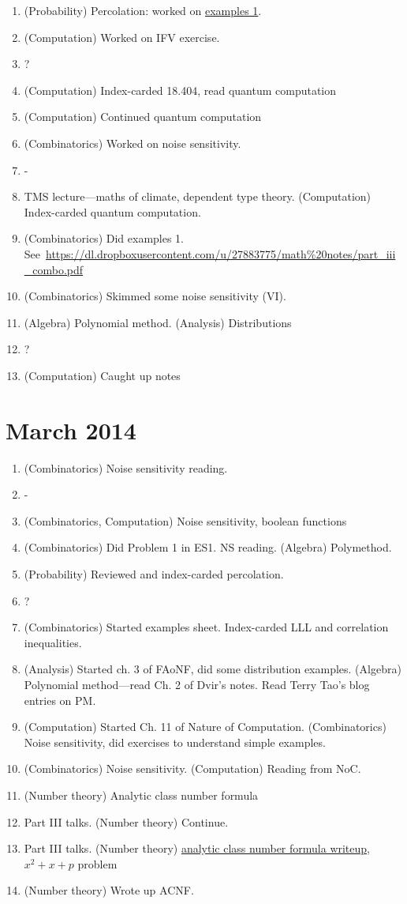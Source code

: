 \begin{enumerate}
\item (Probability) Percolation: worked on \hyperlink{prob/perc/ex1}{examples 1}.
\item (Computation) Worked on IFV exercise.
\item ?
\item (Computation) Index-carded 18.404, read quantum computation
\item (Computation) Continued quantum computation
\item (Combinatorics) Worked on noise sensitivity.
\item -
\item TMS lecture---maths of climate, dependent type theory. (Computation) Index-carded quantum computation.
\item (Combinatorics) Did examples 1. See~\url{https://dl.dropboxusercontent.com/u/27883775/math\%20notes/part_iii_combo.pdf}
\item (Combinatorics) Skimmed some noise sensitivity (VI). 
\item (Algebra) Polynomial method. (Analysis) Distributions
\item ?
\item (Computation) Caught up notes
\end{enumerate}
\section{March 2014}
\begin{enumerate}
\item (Combinatorics) Noise sensitivity reading.
\item -
\item (Combinatorics, Computation) Noise sensitivity, boolean functions
\item (Combinatorics) Did Problem 1 in ES1. NS reading. (Algebra) Polymethod. 
\item (Probability) Reviewed and index-carded percolation.
\item ?
\item (Combinatorics) Started examples sheet. Index-carded LLL and correlation inequalities.
\item (Analysis) Started ch. 3 of FAoNF, did some distribution examples. (Algebra) Polynomial method---read Ch. 2 of Dvir's notes. Read Terry Tao's blog entries on PM.
\item (Computation) Started Ch. 11 of Nature of Computation. (Combinatorics) Noise sensitivity, did exercises to understand simple examples.
\item (Combinatorics) Noise sensitivity. (Computation) Reading from NoC.
\item
(Number theory) Analytic class number formula
\item
Part III talks. (Number theory) Continue.
\item Part III talks. (Number theory) 
\hyperlink{nt/ant/aant}{analytic class number formula writeup}, $x^2+x+p$ problem
\item (Number theory) Wrote up ACNF.
\end{enumerate}

